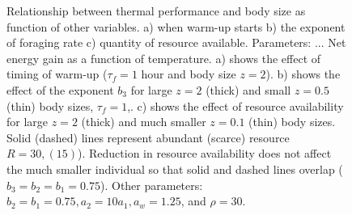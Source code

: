\begin{figure}%
\begin{center}
\caption{
	Relationship between thermal performance and body size as function of other variables.
	a) when warm-up starts
	b) the exponent of foraging rate
	c) quantity of resource available.
	Parameters: ...
	 Net energy gain as a function of temperature.
	a) shows the effect of timing of warm-up ($\tau_f = 1$ hour and body size $z = 2$). %
	b) shows the effect of the exponent $b_3$  for large $z= 2$ (thick) and small $z = 0.5$ (thin) body sizes, $\tau_f = 1$,.
	c) shows the effect of resource availability for large $z = 2$ (thick) and much smaller $z = 0.1$ (thin) body sizes.
	Solid (dashed) lines represent abundant (scarce) resource $R = 30, (15)$).
	Reduction in resource availability does not affect the much smaller individual so that solid and dashed lines overlap ($b_3 = b_2 = b_1 = 0.75$).
	Other parameters: $ b_2 = b_1  = 0.75,  a_2 = 10 a_1, a_w = 1.25$, and  $\rho = 30$.
}%
\label{fig6}
\end{center}
\end{figure}
